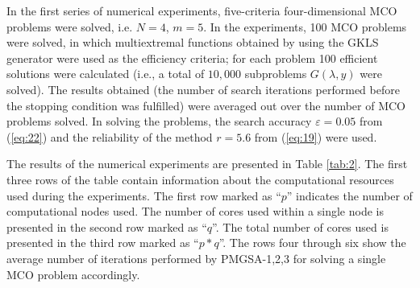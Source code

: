 \documentclass[review]{elsarticle}
\begin{document}
In the first series of numerical experiments, five-criteria four-dimensional MCO problems were solved, i.e. $N = 4$, $m = 5$. In the experiments, 100 MCO problems were solved, in which multiextremal functions obtained by using the GKLS generator \cite{c39} were used as the efficiency criteria; for each problem 100 efficient solutions were calculated (i.e., a total of $10,000$ subproblems $G (\lambda, y)$ were solved). The results obtained (the number of search iterations performed before the stopping condition was fulfilled) were averaged out over the number of MCO problems solved. In solving the problems, the search accuracy $\varepsilon = 0.05$ from (\ref{eq:22}) and the reliability of the method $r = 5.6$ from (\ref{eq:19}) were used.
 
The results of the numerical experiments are presented in Table \ref{tab:2}. The first three rows of the table contain information about the computational resources used during the experiments. The first row marked as ``$p$'' indicates the number of computational nodes used. The number of cores used within a single node is presented in the second row marked as ``$q$''. The total number of cores used is presented in the third row marked as ``$p*q$''. The rows four through six show the average number of iterations performed by PMGSA-1,2,3 for solving a single MCO problem accordingly.
\end{document}
